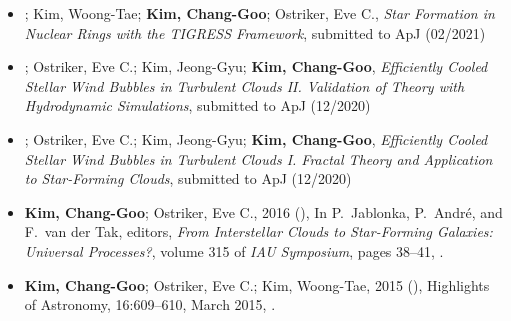 \documentclass[12pt,preprint,letter]{aastex63}
\begin{document}
\begin{itemize}
\begin{itemize}[itemsep=1pt]
\item {}; Kim, Woong-Tae; \textbf{Kim, Chang-Goo}; Ostriker, Eve C., \textit{Star Formation in Nuclear Rings with the TIGRESS Framework}, submitted to ApJ (02/2021)

\item {}; Ostriker, Eve C.; Kim, Jeong-Gyu; \textbf{Kim, Chang-Goo}, \textit{Efficiently Cooled Stellar Wind Bubbles in Turbulent Clouds II. Validation of Theory with Hydrodynamic Simulations}, submitted to ApJ (12/2020)

\item {}; Ostriker, Eve C.; Kim, Jeong-Gyu; \textbf{Kim, Chang-Goo}, \textit{Efficiently Cooled Stellar Wind Bubbles in Turbulent Clouds I. Fractal Theory and Application to Star-Forming Clouds}, submitted to ApJ (12/2020)



\end{itemize}

\begin{itemize}[itemsep=1pt]
\item \textbf{Kim, Chang-Goo}; Ostriker, Eve C., 2016 (), In P.~{Jablonka},
  P.~{Andr{\'e}}, and F.~{van der Tak}, editors, {\em From Interstellar Clouds
  to Star-Forming Galaxies: Universal Processes?}, volume 315 of {\em IAU
  Symposium}, pages 38--41, .
\item \textbf{Kim, Chang-Goo}; Ostriker, Eve C.; Kim, Woong-Tae, 2015 (),
  Highlights of Astronomy, 16:609--610, March 2015, .
\end{itemize}


\end{itemize}
\end{document}
